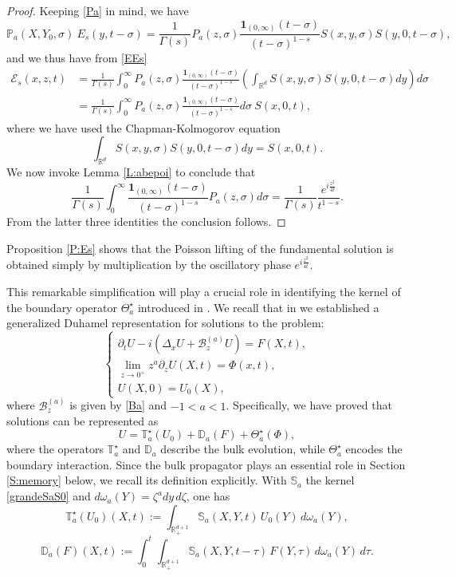 \documentclass[11pt,letter]{amsart}
\def \RN {\mathbb{R}_+^{d+1}}
\def \G{\Gamma}
\newcommand{\Ba}{\mathscr B_z^{(a)}}
\newcommand{\Rd}{\mathbb R^d}
\numberwithin{equation}{section}
\numberwithin{equation}{section}
\begin{document}
\begin{proof}
Keeping \eqref{Pa} in mind, we have
\[
\mathbb P_a(X,Y_0,\sigma)\ E_s(y,t-\sigma) = \frac{1}{\G(s)} P_a(z,\sigma) \frac{\mathbf 1_{(0,\infty)}(t-\sigma)}{(t-\sigma)^{1-s}}  S(x,y,\sigma)  S(y,0,t-\sigma),
\]
and we thus have from \eqref{EEs}
\begin{align*}
\mathscr  E_s(x,z,t) & = \frac{1}{\G(s)}  \int_0^\infty P_a(z,\sigma) \frac{\mathbf 1_{(0,\infty)}(t-\sigma)}{(t-\sigma)^{1-s}} \left(\int_{\Rd}  S(x,y,\sigma)  S(y,0,t-\sigma) dy\right) d\sigma
\\
& = \frac{1}{\G(s)}  \int_0^\infty P_a(z,\sigma) \frac{\mathbf 1_{(0,\infty)}(t-\sigma)}{(t-\sigma)^{1-s}} d\sigma\ S(x,0,t),
\end{align*}
where we have used the Chapman-Kolmogorov equation
\[
\int_{\Rd}  S(x,y,\sigma)  S(y,0,t-\sigma) dy = S(x,0,t).
\]
We now invoke Lemma \ref{L:abepoi} to conclude that 
\begin{equation}\label{abepoi-repeat}
\frac{1}{\G(s)} \int_0^\infty \frac{\mathbf 1_{(0,\infty)}(t-\sigma)}{(t-\sigma)^{1-s}} P_a(z,\sigma) d\sigma = \frac{1}{\G(s)} \frac{e^{i \frac{z^2}{4t}}}{t^{1-s}}.
\end{equation}
From the latter three identities the conclusion follows.

\end{proof}

Proposition \ref{P:Es} shows that the Poisson lifting of the fundamental solution is obtained simply by multiplication by the oscillatory phase $e^{i \frac{z^2}{4t}}$. 

This remarkable simplification will play a crucial role in identifying
the kernel of the boundary operator $\Theta_a^\star$ introduced in
\cite{GS2}. We recall that in \cite{GS2} we established a generalized
Duhamel representation for solutions to the problem:
\begin{equation}\label{nozeroin}
\begin{cases}
\partial_tU-i(\Delta_x U+\Ba U)=F(X,t),\\
\displaystyle \lim_{z\to0^+} z^a\partial_zU(X,t)=\Phi(x,t),\\
U(X,0)=U_0(X),
\end{cases}
\end{equation}
where $\Ba$ is given by \eqref{Ba} and $-1<a<1$. Specifically, we have proved that solutions can be represented as
\[
U= \mathbb T_a^\star(U_0)+\mathbb D_a(F)+\Theta_a^\star(\Phi),
\]
where the operators $\mathbb T_a^\star$ and $\mathbb D_a$ describe the bulk evolution, while $\Theta_a^\star$ encodes the boundary interaction. Since the bulk propagator plays an essential role in Section \ref{S:memory} below, we recall its definition explicitly. With $\mathbb S_a$ the kernel \eqref{grandeSaS0} and $d\omega_a(Y) = \zeta^a dy\, d\zeta$, one has
\begin{equation}\label{E:Tstar}
\mathbb T_a^\star(U_0)(X,t) := \int_{\RN} \mathbb S_a(X,Y,t)\, U_0(Y)\, d\omega_a(Y),
\end{equation}
\begin{equation}\label{E:Da}
\mathbb D_a(F)(X,t) := \int_0^t\!\!\int_{\RN} \mathbb S_a(X,Y,t-\tau)\, F(Y,\tau)\, d\omega_a(Y)\, d\tau .
\end{equation}
\end{document}
